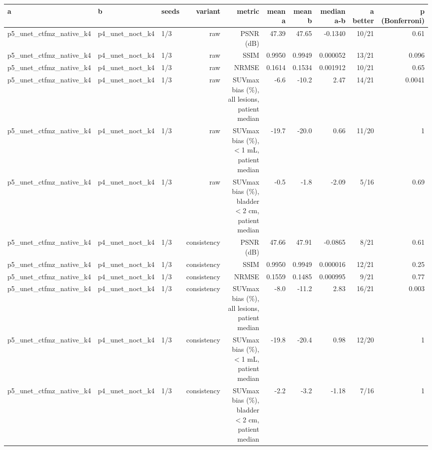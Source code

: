 \begin{tabular}{lllrrrrrrr}
\toprule
a & b & seeds & variant & metric & mean a & mean b & median a-b & a better & p (Bonferroni) \\
\midrule
p5\_unet\_ctfmz\_native\_k4 & p4\_unet\_noct\_k4 & 1/3 & raw & PSNR (dB) & 47.39 & 47.65 & -0.1340 & 10/21 & 0.61 \\
p5\_unet\_ctfmz\_native\_k4 & p4\_unet\_noct\_k4 & 1/3 & raw & SSIM & 0.9950 & 0.9949 & 0.000052 & 13/21 & 0.096 \\
p5\_unet\_ctfmz\_native\_k4 & p4\_unet\_noct\_k4 & 1/3 & raw & NRMSE & 0.1614 & 0.1534 & 0.001912 & 10/21 & 0.65 \\
p5\_unet\_ctfmz\_native\_k4 & p4\_unet\_noct\_k4 & 1/3 & raw & SUVmax bias (\%), all lesions, patient median & -6.6 & -10.2 & 2.47 & 14/21 & 0.0041 \\
p5\_unet\_ctfmz\_native\_k4 & p4\_unet\_noct\_k4 & 1/3 & raw & SUVmax bias (\%), $<$1 mL, patient median & -19.7 & -20.0 & 0.66 & 11/20 & 1 \\
p5\_unet\_ctfmz\_native\_k4 & p4\_unet\_noct\_k4 & 1/3 & raw & SUVmax bias (\%), bladder $<$2 cm, patient median & -0.5 & -1.8 & -2.09 & 5/16 & 0.69 \\
p5\_unet\_ctfmz\_native\_k4 & p4\_unet\_noct\_k4 & 1/3 & consistency & PSNR (dB) & 47.66 & 47.91 & -0.0865 & 8/21 & 0.61 \\
p5\_unet\_ctfmz\_native\_k4 & p4\_unet\_noct\_k4 & 1/3 & consistency & SSIM & 0.9950 & 0.9949 & 0.000016 & 12/21 & 0.25 \\
p5\_unet\_ctfmz\_native\_k4 & p4\_unet\_noct\_k4 & 1/3 & consistency & NRMSE & 0.1559 & 0.1485 & 0.000995 & 9/21 & 0.77 \\
p5\_unet\_ctfmz\_native\_k4 & p4\_unet\_noct\_k4 & 1/3 & consistency & SUVmax bias (\%), all lesions, patient median & -8.0 & -11.2 & 2.83 & 16/21 & 0.003 \\
p5\_unet\_ctfmz\_native\_k4 & p4\_unet\_noct\_k4 & 1/3 & consistency & SUVmax bias (\%), $<$1 mL, patient median & -19.8 & -20.4 & 0.98 & 12/20 & 1 \\
p5\_unet\_ctfmz\_native\_k4 & p4\_unet\_noct\_k4 & 1/3 & consistency & SUVmax bias (\%), bladder $<$2 cm, patient median & -2.2 & -3.2 & -1.18 & 7/16 & 1 \\
\bottomrule
\end{tabular}

